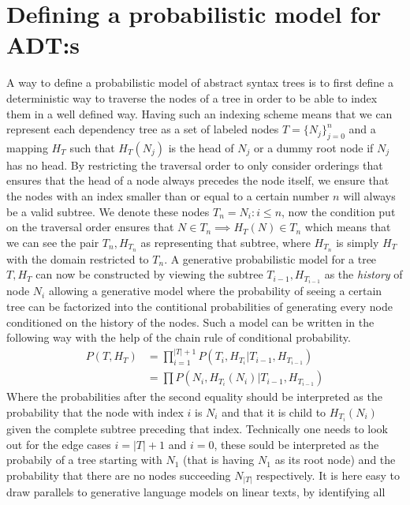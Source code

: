 \section{Defining a probabilistic model for ADT:s}
A way to define a probabilistic model of abstract syntax trees is to first define a deterministic way to traverse the nodes of a tree in order to be able to index them in a well defined way. Having such an indexing scheme means that we can represent each dependency tree as a set of labeled nodes $T=\{N_j\}_{j=0}^n$ and a mapping $H_T$ such that $H_T(N_j)$ is the head of $N_j$ or a dummy root node if $N_j$ has no head. By restricting the traversal order to only consider orderings that ensures that the head of a node always precedes the node itself, we ensure that the nodes with an index smaller than or equal to a certain number $n$ will always be a valid subtree. We denote these nodes $T_n={N_i : i\leq n}$, now the condition put on the traversal order ensures that $N\in T_n \implies H_T(N)\in T_n$ which means that we can see the pair $T_n, H_{T_n}$ as representing that subtree, where $H_{T_n}$ is simply $H_T$ with the domain restricted to $T_n$. 
A generative probabilistic model for a tree $T,H_T$ can now be constructed by viewing the subtree $T_{i-1}, H_{T_{i-1}}$ as the \emph{history} of node $N_i$ allowing a generative model where the probability of seeing a certain tree can be factorized into the contitional probabilities of generating every node conditioned on the history of the nodes. Such a model can be written in the following way with the help of the chain rule of conditional probability.
\begin{equation}
\begin{split}
    P(T, H_T) & = \prod^{|T|+1}_{i=1} P(T_i, H_{T_i}|T_{i-1}, H_{T_{i-1}})\\
    & = \prod P(N_i, H_{T_i}(N_i)|T_{i-1}, H_{T_{i-1}})
\end{split}
\end{equation}
Where the probabilities after the second equality should be interpreted as the probability that the node with index $i$ is $N_i$ and that it is child to $H_{T_i}(N_i)$ given the complete subtree preceding that index. Technically one needs to look out for the edge cases $i=|T|+1$ and $i=0$, these sould be interpreted as the probabily of a tree starting with $N_1$ (that is having $N_1$ as its root node) and the probability that there are no nodes succeeding $N_{|T|}$ respectively. It is here easy to draw parallels to generative language models on linear texts, by identifying all 
